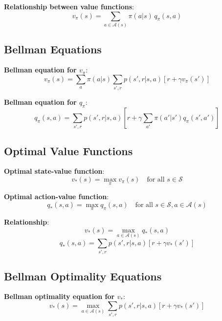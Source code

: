 \documentclass[10pt]{article}
\begin{document}
\textbf{Relationship between value functions}:
\begin{equation}
v_\pi(s) = \sum_{a \in \mathcal{A}(s)} \pi(a|s) \, q_\pi(s,a)
\end{equation}

\subsection{Bellman Equations}

\textbf{Bellman equation for $v_\pi$}:
\begin{equation}
v_\pi(s) = \sum_{a} \pi(a|s) \sum_{s',r} p(s',r|s,a)\left[r + \gamma v_\pi(s')\right]
\end{equation}

\textbf{Bellman equation for $q_\pi$}:
\begin{equation}
q_\pi(s,a) = \sum_{s',r} p(s',r|s,a)\left[r + \gamma \sum_{a'} \pi(a'|s') q_\pi(s',a')\right]
\end{equation}

\subsection{Optimal Value Functions}

\textbf{Optimal state-value function}:
\begin{equation}
v_*(s) = \max_\pi v_\pi(s) \quad \text{for all } s \in \mathcal{S}
\end{equation}

\textbf{Optimal action-value function}:
\begin{equation}
q_*(s,a) = \max_\pi q_\pi(s,a) \quad \text{for all } s \in \mathcal{S}, a \in \mathcal{A}(s)
\end{equation}

\textbf{Relationship}:
\begin{equation}
v_*(s) = \max_{a \in \mathcal{A}(s)} q_*(s,a)
\end{equation}
\begin{equation}
q_*(s,a) = \sum_{s',r} p(s',r|s,a)\left[r + \gamma v_*(s')\right]
\end{equation}

\subsection{Bellman Optimality Equations}

\textbf{Bellman optimality equation for $v_*$}:
\begin{equation}
v_*(s) = \max_{a \in \mathcal{A}(s)} \sum_{s',r} p(s',r|s,a)\left[r + \gamma v_*(s')\right]
\end{equation}
\end{document}
